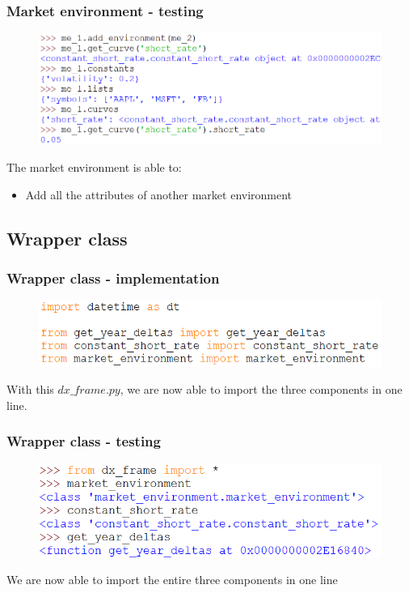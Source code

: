 \documentclass{beamer}
\begin{document}
\begin{frame}
\frametitle{Market environment - testing}
\begin{figure}[H]
	\includegraphics[scale=0.48]{market_environment_example2.png}
\end{figure}
The market environment is able to:
\begin{itemize}
	\item Add all the attributes of another market environment
\end{itemize}
\end{frame}

\subsection{Wrapper class}

\begin{frame}
\frametitle{Wrapper class - implementation}
\begin{figure}[H]
	\includegraphics[scale=0.48]{wrapper_class.png}
\end{figure}
With this $dx\_frame.py$, we are now able to import the three components in one line.
\end{frame}

\begin{frame}
\frametitle{Wrapper class - testing}
\begin{figure}[H]
	\includegraphics[scale=0.48]{wrapper_class_example.png}
\end{figure}
We are now able to import the entire three components in one line
\end{frame}
\end{document}
